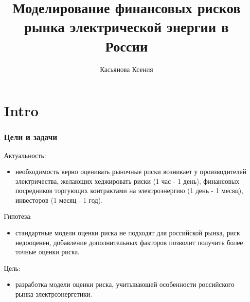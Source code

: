 \documentclass[c, dvipsnames]{beamer}  %
\title[   Моделирование финансовых рисков     ]{Моделирование финансовых рисков    рынка электрической энергии в России }
\author[Касьянова Ксения]{Касьянова Ксения \\ \smallskip \scriptsize  }
\institute[РАНХиГС]{ \uppercase{
  Институт отраслевых рынков и инфраструктуры}}
\date{}
\begin{document}
\frame[plain]{\titlepage}	%

\section{Intro}

\begin{frame}[shrink=3]
\frametitle{Цели и задачи} 


\begin{block}{Актуальность:}
	\begin{itemize}
		
		\item необходимость верно оценивать рыночные риски возникает у производителей электричества, желающих хеджировать  риски (1 час - 1 день),    финансовых посредников  торгующих контрактами на электроэнергию (1 день - 1 месяц), инвесторов (1 месяц - 1 год).
%				
		


	\end{itemize}
\end{block}


\begin{block}{Гипотеза:}
	\begin{itemize}
		
		\item стандартные модели оценки риска не подходят для российской рынка, риск недооценен, добавление дополнительных факторов позволит получить более точные оценки риска. 
	
		
		
		
	\end{itemize}
\end{block}


\begin{block}{Цель:}
	\begin{itemize}
		
		
		\item  разработка модели оценки риска,  учитывающей  особенности российского рынка электроэнергетики. 
		
		
		


\end{itemize}
\end{block}
\end{frame}
\end{document}
